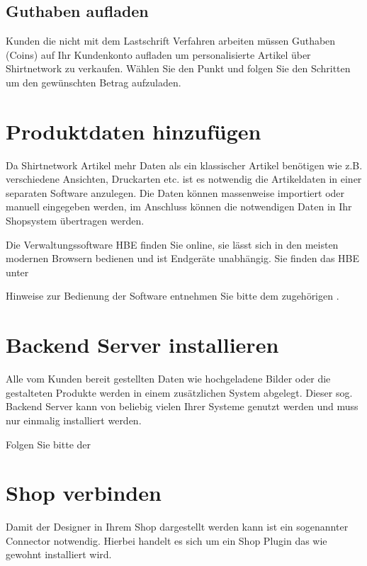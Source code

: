 \documentclass[letterpaper,10pt,ngerman]{sphinxmanual}
\begin{document}
\subsection{Guthaben aufladen}
\label{\detokenize{intro/account:guthaben-aufladen}}
Kunden die nicht mit dem Lastschrift Verfahren arbeiten müssen Guthaben (Coins) auf Ihr Kundenkonto aufladen um
personalisierte Artikel über Shirtnetwork zu verkaufen. Wählen Sie den Punkt  und folgen Sie den Schritten
um den gewünschten Betrag aufzuladen.


\section{Produktdaten hinzufügen}
\label{\detokenize{intro/hbe:produktdaten-hinzufugen}}\label{\detokenize{intro/hbe::doc}}
Da Shirtnetwork Artikel mehr Daten als ein klassischer Artikel benötigen wie z.B. verschiedene Ansichten, Druckarten etc.
ist es notwendig die Artikeldaten in einer separaten Software anzulegen. Die Daten können massenweise importiert
oder manuell eingegeben werden, im Anschluss können die notwendigen Daten in Ihr Shopsystem übertragen werden.

Die Verwaltungssoftware HBE finden Sie online, sie lässt sich in den meisten modernen Browsern bedienen und ist Endgeräte unabhängig.
Sie finden das HBE unter 

Hinweise zur Bedienung der Software entnehmen Sie bitte dem zugehörigen .


\section{Backend Server installieren}
\label{\detokenize{intro/backend:backend-server-installieren}}\label{\detokenize{intro/backend::doc}}
Alle vom Kunden bereit gestellten Daten wie hochgeladene Bilder oder die gestalteten Produkte werden in einem zusätzlichen
System abgelegt. Dieser sog. Backend Server kann von beliebig vielen Ihrer Systeme genutzt werden und muss nur einmalig
installiert werden.

Folgen Sie bitte der {\hyperref[\detokenize{tools/backend::doc}]{}}


\section{Shop verbinden}
\label{\detokenize{intro/connect:shop-verbinden}}\label{\detokenize{intro/connect::doc}}
Damit der Designer in Ihrem Shop dargestellt werden kann ist ein sogenannter Connector notwendig. Hierbei handelt es sich
um ein Shop Plugin das wie gewohnt installiert wird.
\end{document}
